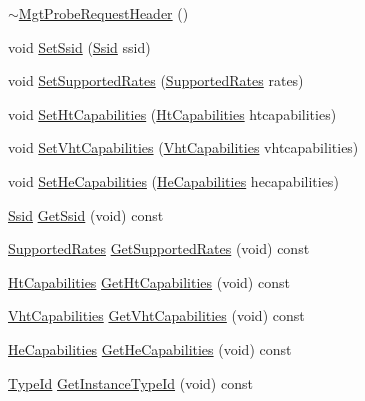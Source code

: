 \begin{DoxyCompactItemize}
\item 
\hyperlink{classns3_1_1MgtProbeRequestHeader_a4a725a62353247d4c6de21903bc6b5da}{$\sim$\+Mgt\+Probe\+Request\+Header} ()
\item 
void \hyperlink{classns3_1_1MgtProbeRequestHeader_a438054e5d02100f044ed1a81a53f8653}{Set\+Ssid} (\hyperlink{classns3_1_1Ssid}{Ssid} ssid)
\item 
void \hyperlink{classns3_1_1MgtProbeRequestHeader_a48156bc2427fcc8c631fabb4027c7ed1}{Set\+Supported\+Rates} (\hyperlink{classns3_1_1SupportedRates}{Supported\+Rates} rates)
\item 
void \hyperlink{classns3_1_1MgtProbeRequestHeader_ad955328c22acf613431df843de80dcb7}{Set\+Ht\+Capabilities} (\hyperlink{classns3_1_1HtCapabilities}{Ht\+Capabilities} htcapabilities)
\item 
void \hyperlink{classns3_1_1MgtProbeRequestHeader_a63e1514be33996e5ae02dc9aee835dd3}{Set\+Vht\+Capabilities} (\hyperlink{classns3_1_1VhtCapabilities}{Vht\+Capabilities} vhtcapabilities)
\item 
void \hyperlink{classns3_1_1MgtProbeRequestHeader_aab7a25eff7d28fa3665bb3b5aaf1f07f}{Set\+He\+Capabilities} (\hyperlink{classns3_1_1HeCapabilities}{He\+Capabilities} hecapabilities)
\item 
\hyperlink{classns3_1_1Ssid}{Ssid} \hyperlink{classns3_1_1MgtProbeRequestHeader_a2e47aa5456309153cc7fcae3ad7bf90d}{Get\+Ssid} (void) const 
\item 
\hyperlink{classns3_1_1SupportedRates}{Supported\+Rates} \hyperlink{classns3_1_1MgtProbeRequestHeader_a03fd72f79cc91f81995ada7c1534e98f}{Get\+Supported\+Rates} (void) const 
\item 
\hyperlink{classns3_1_1HtCapabilities}{Ht\+Capabilities} \hyperlink{classns3_1_1MgtProbeRequestHeader_a5859ed023a5edd029e799013e277b21b}{Get\+Ht\+Capabilities} (void) const 
\item 
\hyperlink{classns3_1_1VhtCapabilities}{Vht\+Capabilities} \hyperlink{classns3_1_1MgtProbeRequestHeader_aeecf3888ba14fce23f04a1b917f961df}{Get\+Vht\+Capabilities} (void) const 
\item 
\hyperlink{classns3_1_1HeCapabilities}{He\+Capabilities} \hyperlink{classns3_1_1MgtProbeRequestHeader_a5c9e0989ca9acc37ecdf3aefb44f284e}{Get\+He\+Capabilities} (void) const 
\item 
\hyperlink{classns3_1_1TypeId}{Type\+Id} \hyperlink{classns3_1_1MgtProbeRequestHeader_a319a240834c0040c09d3b9bf28b839ed}{Get\+Instance\+Type\+Id} (void) const 

\end{DoxyCompactItemize}
